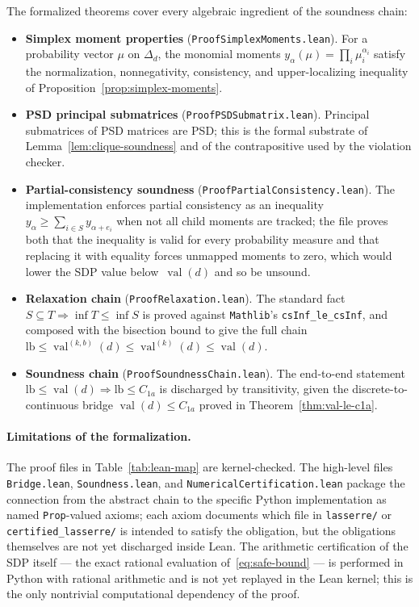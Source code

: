 \documentclass[11pt, letterpaper]{article}
\theoremstyle{paperplain}
\theoremstyle{paperdef}
\newcommand{\val}{\operatorname{val}}
\begin{document}
The formalized theorems cover every algebraic ingredient of the
soundness chain:
\begin{itemize}
  \item \textbf{Simplex moment properties}
    (\texttt{ProofSimplexMoments.lean}).  For a probability vector
    $\mu$ on $\Delta_d$, the monomial moments
    $y_\alpha(\mu)=\prod_i\mu_i^{\alpha_i}$ satisfy the
    normalization, nonnegativity, consistency, and upper-localizing
    inequality of Proposition~\ref{prop:simplex-moments}.
  \item \textbf{PSD principal submatrices}
    (\texttt{ProofPSDSubmatrix.lean}).  Principal submatrices of
    PSD matrices are PSD; this is the formal substrate of
    Lemma~\ref{lem:clique-soundness} and of the contrapositive used
    by the violation checker.
  \item \textbf{Partial-consistency soundness}
    (\texttt{ProofPartialConsistency.lean}).  The implementation
    enforces partial consistency as an inequality
    $y_\alpha\ge\sum_{i\in S}y_{\alpha+e_i}$ when not all child
    moments are tracked; the file proves both that the inequality is
    valid for every probability measure and that replacing it with
    equality forces unmapped moments to zero, which would lower the
    SDP value below~$\val(d)$ and so be unsound.
  \item \textbf{Relaxation chain} (\texttt{ProofRelaxation.lean}).
    The standard fact $S\subseteq T\Rightarrow \inf T\le\inf S$ is
    proved against \texttt{Mathlib}'s \texttt{csInf\_le\_csInf}, and
    composed with the bisection bound to give the full chain
    $\mathrm{lb}\le \val^{(k,b)}(d)\le \val^{(k)}(d)\le \val(d)$.
  \item \textbf{Soundness chain} (\texttt{ProofSoundnessChain.lean}).
    The end-to-end statement
    $\mathrm{lb}\le\val(d)\Rightarrow \mathrm{lb}\le C_{1a}$ is
    discharged by transitivity, given the discrete-to-continuous
    bridge $\val(d)\le C_{1a}$ proved in
    Theorem~\ref{thm:val-le-c1a}.
\end{itemize}

\paragraph{Limitations of the formalization.}
The proof files in Table~\ref{tab:lean-map} are kernel-checked.  The
high-level files \texttt{Bridge.lean}, \texttt{Soundness.lean}, and
\texttt{NumericalCertification.lean} package the connection from
the abstract chain to the specific Python implementation as named
\texttt{Prop}-valued axioms; each axiom documents which file in
\texttt{lasserre/} or \texttt{certified\_lasserre/} is intended to
satisfy the obligation, but the obligations themselves are not yet
discharged inside Lean.  The arithmetic certification of the SDP
itself --- the exact rational evaluation
of~\eqref{eq:safe-bound} --- is performed in Python with rational
arithmetic and is not yet replayed in the Lean kernel; this is the
only nontrivial computational dependency of the proof.
\end{document}
